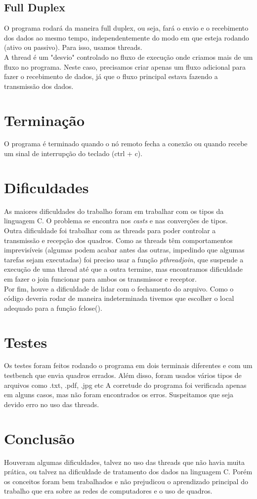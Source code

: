 \documentclass[10pt]{article}
\begin{document}
		\subsection{Full Duplex}
			O programa rodará da maneira full duplex, ou seja, fará o envio e o recebimento dos dados ao mesmo tempo, independentemente do modo em que esteja rodando (ativo ou passivo). Para isso, usamos threads. 
			\\ A thread é um "desvio" controlado no fluxo de execução onde criamos mais de um fluxo no programa. Neste caso, precisamos criar apenas um fluxo adicional para fazer o recebimento de dados, já que o fluxo principal estava fazendo a transmissão dos dados.
	\section{Terminação}
		O programa é terminado quando o nó remoto fecha a conexão ou quando recebe um sinal de interrupção do teclado (ctrl + c).
	\section{Dificuldades}
		As maiores dificuldades do trabalho foram em trabalhar com os tipos da linguagem C. O problema se encontra nos \textit{casts} e nas converções de tipos.
		\\Outra dificuldade foi trabalhar com as threads para poder controlar a transmissão e recepção dos quadros. Como as threads têm comportamentos imprevisíveis (algumas podem acabar antes das outras, impedindo que algumas tarefas sejam executadas) foi preciso usar a função \textit{pthreadjoin}, que suspende a execução de uma thread até que a outra termine, mas encontramos dificuldade em fazer o join funcionar para ambos os transmissor e receptor.
		\\Por fim, houve a dificuldade de lidar com o fechamento do arquivo. Como o código deveria rodar de maneira indeterminada tivemos que escolher o local adequado para a função fclose().
	\section{Testes}
		Os testes foram feitos rodando o programa em dois terminais diferentes e com um testbench que envia quadros errados. Além disso, foram usados vários tipos de arquivos como .txt, .pdf, .jpg etc
		A corretude do programa foi verificada apenas em alguns casos, mas não foram encontrados os erros. Suspeitamos que seja devido erro no uso das threads.
	\section{Conclusão} 
		Houveram algumas dificuldades, talvez no uso das threads que não havia muita prática, ou talvez na dificuldade de tratamento dos dados na linguagem C. Porém os conceitos foram bem trabalhados e não prejudicou o aprendizado principal do trabalho que era sobre as redes de computadores e o uso de quadros.
\end{document}
